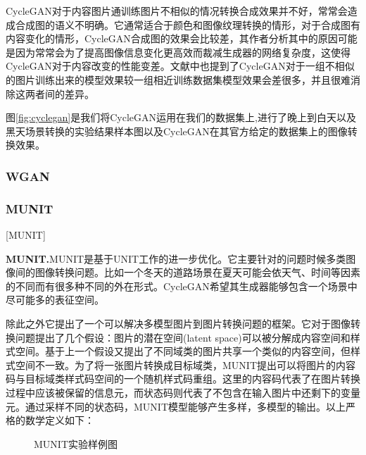 CycleGAN对于内容图片通训练图片不相似的情况转换合成效果并不好，常常会造成合成图的语义不明确。它通常适合于颜色和图像纹理转换的情形，对于合成图有内容变化的情形，CycleGAN合成图的效果会比较差，其作者分析其中的原因可能是因为常常会为了提高图像信息变化更高效而裁减生成器的网络复杂度，这使得CycleGAN对于内容改变的性能变差。文献\cite{CycleGAN}中也提到了CycleGAN对于一组不相似的图片训练出来的模型效果较一组相近训练数据集模型效果会差很多，并且很难消除这两者间的差异。

图\ref{fig:cyclegan}是我们将CycleGAN运用在我们的数据集上,进行了晚上到白天以及黑天场景转换的实验结果样本图以及CycleGAN在其官方给定的数据集上的图像转换效果。 



\subsubsection{WGAN}


\subsubsection{MUNIT}[MUNIT]

\textbf{MUNIT.}\cite{MUNIT}\quad MUNIT是基于UNIT\cite{UNIT}工作的进一步优化。它主要针对的问题时候多类图像间的图像转换问题。比如一个冬天的道路场景在夏天可能会依天气、时间等因素的不同而有很多种不同的外在形式。CycleGAN希望其生成器能够包含一个场景中尽可能多的表征空间。

除此之外它提出了一个可以解决多模型图片到图片转换问题的框架。它对于图像转换问题提出了几个假设：图片的潜在空间(latent space)可以被分解成内容空间和样式空间。基于上一个假设又提出了不同域类的图片共享一个类似的内容空间，但样式空间不一致。为了将一张图片转换成目标域类，MUNIT提出可以将图片的内容码与目标域类样式码空间的一个随机样式码重组。这里的内容码代表了在图片转换过程中应该被保留的信息元，而状态码则代表了不包含在输入图片中还剩下的变量元。通过采样不同的状态码，MUNIT模型能够产生多样，多模型的输出。以上严格的数学定义如下：

\begin{figure}[t]
    \centering
    \caption{MUNIT实验样例图}
    \label{fig:munit}
\end{figure}

